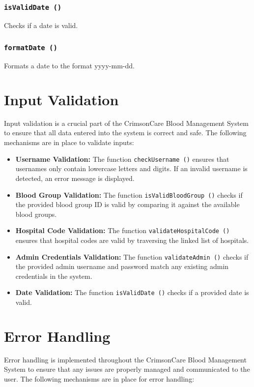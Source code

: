 \documentclass[12pt,a4paper]{report}
\begin{document}
\subsubsection{\texttt{isValidDate ()}}
Checks if a date is valid.


\subsubsection{\texttt{formatDate ()}}
Formats a date to the format yyyy-mm-dd.


\section{Input Validation}
Input validation is a crucial part of the CrimsonCare Blood Management System to ensure that all data
entered into the system is correct and safe. The following mechanisms are in place to validate inputs:

\begin{itemize}
    \item \textbf{Username Validation:} The function \texttt{checkUsername ()} ensures that usernames only contain lowercase letters and digits. If an invalid username is detected, an error message is displayed.
    \item \textbf{Blood Group Validation:} The function \texttt{isValidBloodGroup ()} checks if the provided blood group ID is valid by comparing it against the available blood groups.
    \item \textbf{Hospital Code Validation:} The function \texttt{validateHospitalCode ()} ensures that hospital codes are valid by traversing the linked list of hospitals.
    \item \textbf{Admin Credentials Validation:} The function \texttt{validateAdmin ()} checks if the provided admin username and password match any existing admin credentials in the system.
    \item \textbf{Date Validation:} The function \texttt{isValidDate ()} checks if a provided date is valid.
\end{itemize}

\section{Error Handling}
Error handling is implemented throughout the CrimsonCare Blood Management System to ensure that any issues are properly managed and communicated to the user. The following mechanisms are in place for error handling:
\end{document}
